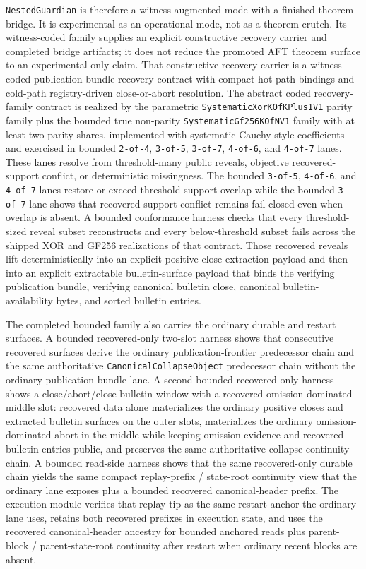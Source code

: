 \documentclass[11pt]{article}
\newcommand{\AFT}{\textsc{AFT}}
\newcommand{\code}[1]{\texttt{#1}}
\begin{document}
\code{NestedGuardian} is therefore a witness-augmented mode with a finished
theorem bridge. It is experimental as an operational mode, not as a theorem
crutch. Its witness-coded family supplies an explicit constructive recovery
carrier and completed bridge artifacts; it does not reduce the promoted
\AFT{} theorem surface to an experimental-only claim. That constructive
recovery carrier is a witness-coded publication-bundle recovery contract with
compact hot-path bindings and cold-path registry-driven close-or-abort
resolution. The abstract coded
recovery-family contract is realized by the parametric
\code{SystematicXorKOfKPlus1V1} parity family plus the bounded true non-parity
\code{SystematicGf256KOfNV1} family with at least two parity shares,
implemented with systematic Cauchy-style coefficients and exercised in bounded
\code{2-of-4}, \code{3-of-5}, \code{3-of-7}, \code{4-of-6}, and \code{4-of-7}
lanes. These lanes resolve from threshold-many public reveals, objective
recovered-support conflict, or deterministic missingness. The bounded
\code{3-of-5}, \code{4-of-6}, and \code{4-of-7} lanes restore or exceed
threshold-support overlap while the bounded \code{3-of-7} lane shows that
recovered-support conflict remains fail-closed even when overlap is absent. A
bounded conformance harness checks that every threshold-sized reveal subset
reconstructs and every below-threshold subset fails across the shipped XOR and
GF256 realizations of that contract. Those recovered reveals lift
deterministically into an explicit positive close-extraction payload and then
into an explicit extractable bulletin-surface payload that binds the verifying
publication bundle, verifying canonical bulletin close, canonical
bulletin-availability bytes, and sorted bulletin entries.

The completed bounded family also carries the ordinary durable and restart
surfaces. A bounded recovered-only two-slot harness shows that consecutive
recovered surfaces derive the ordinary publication-frontier predecessor chain
and the same authoritative \code{CanonicalCollapseObject} predecessor chain
without the ordinary publication-bundle lane. A second bounded recovered-only
harness shows a close/abort/close bulletin window with a recovered
omission-dominated middle slot: recovered data alone materializes the ordinary
positive closes and extracted bulletin surfaces on the outer slots,
materializes the ordinary omission-dominated abort in the middle while keeping
omission evidence and recovered bulletin entries public, and preserves the same
authoritative collapse continuity chain. A bounded read-side harness shows that
the same recovered-only durable chain yields the same compact replay-prefix /
state-root continuity view that the ordinary lane exposes plus a bounded
recovered canonical-header prefix. The execution module verifies that replay
tip as the same restart anchor the ordinary lane uses, retains both recovered
prefixes in execution state, and uses the recovered canonical-header ancestry
for bounded anchored reads plus parent-block / parent-state-root continuity
after restart when ordinary recent blocks are absent.
\end{document}
